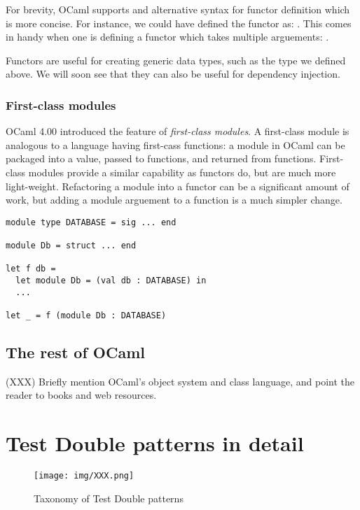 For brevity, OCaml supports and alternative syntax for functor
definition which is more concise. For instance, we could have defined
the  functor as:
.
This comes in handy when one is defining a functor which takes
multiple arguements:
 .

Functors are useful for creating generic data types, such as the
 type we defined above. We will soon see that they can also
be useful for dependency injection.

\subsubsection{First-class modules}

OCaml 4.00 introduced the feature of \textit{first-class modules}. A
first-class module is analogous to a language having first-cass
functions: a module in OCaml can be packaged into a value, passed to
functions, and returned from functions. First-class modules provide a
similar capability as functors do, but are much more
light-weight. Refactoring a module into a functor can be a significant
amount of work, but adding a module arguement to a function is a much
simpler change.

\begin{lstlisting}
module type DATABASE = sig ... end

module Db = struct ... end

let f db =
  let module Db = (val db : DATABASE) in
  ...

let _ = f (module Db : DATABASE)
\end{lstlisting}

\subsection{The rest of OCaml}

(XXX) Briefly mention OCaml's object system and class language, and point
the reader to books and web resources.

\section{Test Double patterns in detail}
\label{testdoubles}

\begin{figure}
  \centering
  \texttt{[image: img/XXX.png]}
  \caption[Taxonomy of Test Double patterns]{Taxonomy of Test Double patterns\footnotemark}
  \label{fig:taxonomy}
\end{figure}

